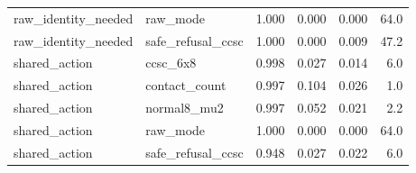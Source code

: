 \begin{tabular}{llrrrr}
raw\_identity\_needed & raw\_mode & 1.000 & 0.000 & 0.000 & 64.0 \\
raw\_identity\_needed & safe\_refusal\_ccsc & 1.000 & 0.000 & 0.009 & 47.2 \\
shared\_action & ccsc\_6x8 & 0.998 & 0.027 & 0.014 & 6.0 \\
shared\_action & contact\_count & 0.997 & 0.104 & 0.026 & 1.0 \\
shared\_action & normal8\_mu2 & 0.997 & 0.052 & 0.021 & 2.2 \\
shared\_action & raw\_mode & 1.000 & 0.000 & 0.000 & 64.0 \\
shared\_action & safe\_refusal\_ccsc & 0.948 & 0.027 & 0.022 & 6.0 \\
\bottomrule
\end{tabular}
